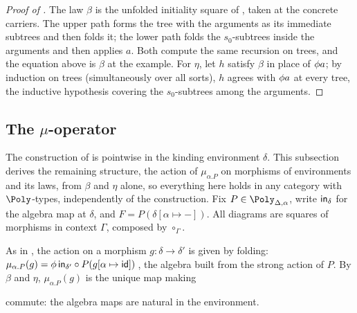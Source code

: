 \begin{proof}[Proof of ]
The law $\beta$ is the unfolded initiality square of ,
taken at the concrete carriers. The upper path forms the tree with the arguments as its immediate
subtrees and then folds it; the lower path folds the $s_0$-subtrees inside the arguments and then
applies $a$. Both compute the same recursion on trees, and the equation above is $\beta$ at the
example. For $\eta$, let $h$ satisfy $\beta$ in place of $\phi{a}$; by induction on trees
(simultaneously over all sorts), $h$ agrees with $\phi{a}$ at every tree, the inductive
hypothesis covering the $s_0$-subtrees among the arguments.
\end{proof}

\subsection{The $\mu$-operator}
\label{sec:polynomial-types:mu-operator}

The construction of  is pointwise in the kinding environment
$\delta$. This subsection derives the remaining structure, the action of $\mu_{\alpha.P}$ on morphisms
of environments and its laws, from $\beta$ and $\eta$ alone, so everything here holds in any category
with $\Poly$-types, independently of the construction. Fix $P \in \Poly_{\Delta,\alpha}$, write
$\mathsf{in}_\delta$ for the algebra map at $\delta$, and $F = P(\delta[\alpha \mapsto -])$. All diagrams
are squares of morphisms in context $\Gamma$, composed by $\circ_\Gamma$.

As in \citet[Proposition~4]{nunes2023}, the action on a morphism $g : \delta \to \delta'$ is
given by folding: $\mu_{\alpha.P}(g) = \phi{\,\mathsf{in}_{\delta'} \circ P(g[\alpha \mapsto \mathsf{id}])\,}$,
the algebra built from the strong action of $P$. By $\beta$ and $\eta$, $\mu_{\alpha.P}(g)$ is the
unique map making
\begin{center}
\end{center}
commute: the algebra maps are natural in the environment.

